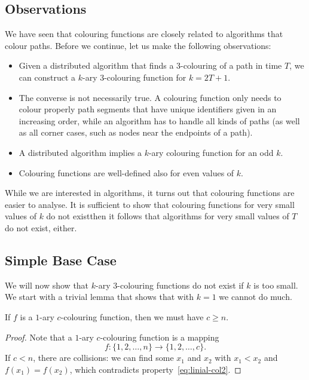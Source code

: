 \subsection{Observations}

We have seen that colouring functions are closely related to algorithms that colour paths. Before we continue, let us make the following observations:
\begin{itemize}
    \item Given a distributed algorithm that finds a $3$-colouring of a path in time $T$, we can construct a $k$-ary $3$-colouring function for $k = 2T+1$.
    \item The converse is not necessarily true. A colouring function only needs to colour properly path segments that have unique identifiers given in an increasing order, while an algorithm has to handle all kinds of paths (as well as all corner cases, such as nodes near the endpoints of a path).
    \item A distributed algorithm implies a $k$-ary colouring function for an odd $k$.
    \item Colouring functions are well-defined also for even values of $k$.
\end{itemize}
While we are interested in algorithms, it turns out that colouring functions are easier to analyse. It is sufficient to show that colouring functions for very small values of $k$ do not exist\mydash then it follows that algorithms for very small values of $T$ do not exist, either.


\subsection{Simple Base Case}

We will now show that $k$-ary $3$-colouring functions do not exist if $k$ is too small. We start with a trivial lemma that shows that with $k = 1$ we cannot do much.

\begin{lemma}\label{lem:linial-base}
    If $f$ is a $1$-ary $c$-colouring function, then we must have $c \ge n$.
\end{lemma}
\begin{proof}
    Note that a $1$-ary $c$-colouring function is a mapping
    \[
        f\colon \{1,2,\dotsc,n\} \to \{1,2,\dotsc,c\}.
    \]
    If $c < n$, there are collisions: we can find some $x_1$ and $x_2$ with $x_1 < x_2$ and $f(x_1) = f(x_2)$, which contradicts property~\eqref{eq:linial-col2}.
\end{proof}


